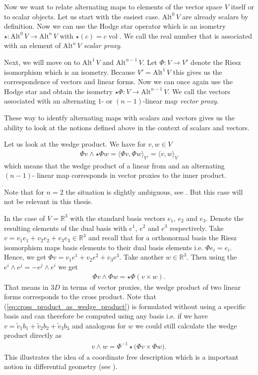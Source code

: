 \documentclass[12pt,a4paper]{article}
\numberwithin{equation}{subsection}
\numberwithin{lemma}{subsection}
\theoremstyle{definition}
\DeclareMathOperator{\vol}{vol}
\newcommand{\alternating}[2]{ {\text{Alt}^{#1}\,#2} }
\newcommand{\real}{\mathbb{R}}
\begin{document}
Now we want to relate alternating maps to elements of the 
vector space $V$ itself or to scalar objects. Let us start with the easiest 
case. $\alternating{0}{V}$ are already scalars by definition. Now we can use 
the Hodge star operator which is an isometry 
$\star: \alternating{0}{V} \rightarrow \alternating{n}{V}$ with
$\star (c) = c \vol$. 
We call the real number that is associated with an element of 
$\alternating{n}{V}$ \textit{scalar proxy}. 

Next, we will move on to $\alternating{1}{V}$ and $\alternating{n-1}{V}$. 
Let $\Phi: V \rightarrow V'$ denote the Riesz isomorphism which is an isometry.
Because $V' = \alternating{1}{V}$ this gives us the correspondence of 
vectors and linear forms. Now we can once again use the Hodge star and obtain 
the isometry $\star \Phi: V \rightarrow \alternating{n-1}{V}$. We call 
the vectors associated with an alternating $1$- or $(n-1)$-linear map 
\textit{vector proxy}.

These way to identfy alternating maps with scalars and vectors gives us the 
ability to look at the notions defined above in the context of scalars 
and vectors.

Let us look at the wedge product. We have for $v,w \in V$
\begin{align*}
    \Phi v \wedge \star \Phi w = \langle \Phi v , \Phi w \rangle_{V'} 
    = \langle v , w \rangle_{V}
\end{align*}
which means that the wedge product of a linear from and an alternating $(n-1)$-
linear map corresponds in vector proxies to the inner product.

Note that for $n=2$ the situation 
is slightly ambiguous, see \cite[p.67]{arnold}. But this case will not be
relevant in this thesis. %

In the case of $V= \real^3$ with the standard basis
vectors $e_1$, $e_2$ and $e_3$. Denote the resulting elements 
of the dual basis with $e^1$, $e^2$ and $e^3$ respectively. 
Take $v = v_1 e_1 + v_2 e_2 + v_3 e_3 \in \real^3$ 
and recall that for a orthonormal basis the Riesz isomorphism maps basis 
elements to their dual basis elements i.e. $\Phi e_i = e_i$. Hence, 
we get $\Phi v = v_1 e^1 + v_2 e^2 + v_3 e^3$. Take another $w \in \real^3$.
Then using the $e^i \wedge e^j = - e^j \wedge e^i$ we get 
\begin{align}
    \Phi v \wedge \Phi w = \star \Phi (v \times w). 
    \label{eq:cross_product_as_wedge_product}
\end{align}
That means in $3D$ in terms of vector proxies, the wedge product 
of two linear forms corresponds to the cross product. Note that 
(\ref{eq:cross_product_as_wedge_product}) is formulated without using a 
specific basis and can therefore be computed using any basis i.e. 
if we have $v = \tilde{v}_1 b_1 + \tilde{v}_2 b_2 + \tilde{v}_3 b_3$ 
and analogous for $w$ we could still calculate the wedge product directly as 
\begin{align*}
    v \wedge w = \Phi^{-1} \star \big(\Phi v \times \Phi w \big).
\end{align*}
This illustrates the idea of a coordinate free description which is a important
notion in differential geometry (see \cite{}).
\end{document}
